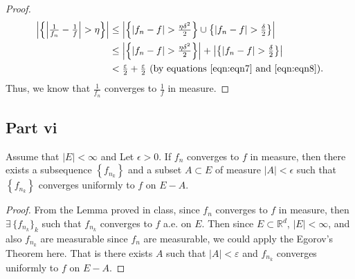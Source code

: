 \begin{answer}
\begin{proof}
\begin{equation}
\begin{aligned}
                \left\lvert\left\{\left\lvert\tfrac{1}{f_n} - \tfrac{1}{f}\right\rvert > \eta \right\}\right\rvert &\leq \left\lvert \left\{\lvert f_n -f \rvert > \tfrac{\eta\delta^2}{2}\right\} \cup \left\{\lvert f_n - f \rvert > \tfrac{\delta}{2}\right\} \right\rvert\\
                & \leq \left\lvert \left\{\lvert f_n -f \rvert > \tfrac{\eta\delta^2}{2}\right\}\right \rvert + \left\lvert\left\{\lvert f_n - f \rvert > \tfrac{\delta}{2}\right\}\right\rvert\\
                &< \tfrac{\varepsilon}{2} + \tfrac{\varepsilon}{2} \text{ (by equations \ref{eqn:eqn7} and \ref{eqn:eqn8})}.
            \end{aligned}
        \end{equation}
        Thus, we know that $\tfrac{1}{f_n}$ converges to $\tfrac{1}{f}$ in measure.
    \end{proof}
\end{answer}

\subsection{Part vi}

\begin{question}
   Assume that $|E|<\infty$ and Let $\epsilon>0$. If $f_n$ converges to $f$ in measure, then there exists a subsequence $\left\{f_{n_k}\right\}$ and a subset $A \subset E$ of measure $|A|<\epsilon$ such that $\left\{f_{n_k}\right\}$ converges uniformly to $f$ on $E-A$.
\end{question}

\begin{answer}
    \begin{proof}
    From the Lemma proved in class, since $f_n$ converges to $f$ in measure, then $\exists \, \{f_{n_k}\}_k$ such that $f_{n_k}$ converges to $f$ a.e. on $E$. Then since $E \subset \mathbb{R}^d$, $\lvert E \rvert < \infty$, and also $f_{n_k}$ are measurable since $f_n$ are measurable, we could apply the Egorov's Theorem here. That is there exists $A$ such that $\lvert A \rvert < \varepsilon$ and $f_{n_k}$ converges uniformly to $f$ on $E-A$.
    \end{proof}
\end{answer}
